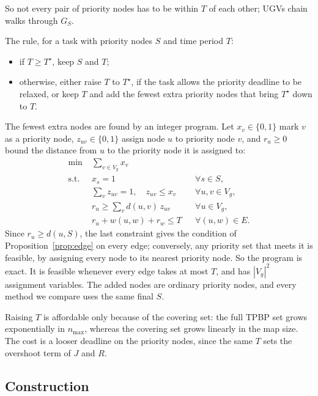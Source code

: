 \documentclass[11pt]{article}
\theoremstyle{definition}
\theoremstyle{plain}
\begin{document}
So not every pair of priority nodes has to be within $T$ of each other;
UGVs chain walks through $G_S$.

The rule, for a task with priority nodes $S$ and time period $T$:
\begin{itemize}
\item if $T \geq T^\star$, keep $S$ and $T$;
\item otherwise, either raise $T$ to $T^\star$, if the task allows the
priority deadline to be relaxed, or keep $T$ and add the fewest extra
priority nodes that bring $T^\star$ down to $T$.
\end{itemize}
The fewest extra nodes are found by an integer program. Let $x_v \in \{0,
1\}$ mark $v$ as a priority node, $z_{uv} \in \{0, 1\}$ assign node $u$ to
priority node $v$, and $r_u \geq 0$ bound the distance from $u$ to the
priority node it is assigned to:
\begin{equation}
\begin{aligned}
\min \;& \textstyle\sum_{v \in V_g} x_v \\
\text{s.t. } & x_s = 1 && \forall s \in S, \\
& \textstyle\sum_{v} z_{uv} = 1,\quad z_{uv} \leq x_v && \forall u, v \in V_g, \\
& r_u \geq \textstyle\sum_{v} d(u, v)\, z_{uv} && \forall u \in V_g, \\
& r_u + w(u, w) + r_w \leq T && \forall (u, w) \in E .
\end{aligned}
\end{equation}
Since $r_u \geq d(u, S)$, the last constraint gives the condition of
Proposition~\ref{prop:edge} on every edge; conversely, any priority set
that meets it is feasible, by assigning every node to its nearest
priority node. So the program is exact. It is feasible whenever every edge
takes at most $T$, and has $|V_g|^2$ assignment variables. The added nodes
are ordinary priority nodes, and every method we compare uses the same
final $S$.

Raising $T$ is affordable only because of the covering set: the full TPBP
set grows exponentially in $n_{\max}$, whereas the covering set grows
linearly in the map size. The cost is a looser deadline on the priority
nodes, since the same $T$ sets the overshoot term of $J$ and $R$.

\subsection{Construction}
\end{document}
